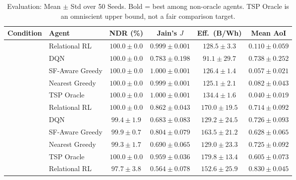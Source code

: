 \documentclass[conference]{IEEEtran}
\begin{document}
\begin{table}[htbp]
\caption{Evaluation: Mean $\pm$ Std over 50 Seeds. Bold = best among non-oracle agents. TSP Oracle is an omniscient upper bound, not a fair comparison target.}
\begin{center}
\setlength{\tabcolsep}{4pt}
\renewcommand{\arraystretch}{1.05}
\begin{tabular}{|c|l|c|c|c|c|}
\hline
\textbf{Condition} & \textbf{Agent} & \textbf{NDR (\%)} & \textbf{Jain's $J$} & \textbf{Eff.\ (B/Wh)} & \textbf{Mean AoI} \\
\hline
{}
  & Relational RL   & $\mathbf{100.0\pm0.0}$ & $\mathbf{0.999\pm0.001}$ & $\mathbf{128.5\pm3.3}$  & $0.110\pm0.059$ \\
  & DQN             & $100.0\pm0.0$           & $0.783\pm0.198$           & $91.1\pm29.7$           & $0.738\pm0.252$ \\
  & SF-Aware Greedy & $100.0\pm0.0$           & $1.000\pm0.001$           & $126.4\pm1.4$           & $\mathbf{0.057\pm0.021}$ \\
  & Nearest Greedy  & $100.0\pm0.0$           & $0.999\pm0.001$           & $125.1\pm2.1$           & $0.082\pm0.043$ \\
  & TSP Oracle      & $100.0\pm0.0$           & $1.000\pm0.001$           & $134.4\pm1.6$           & $0.040\pm0.019$ \\
\hline
{}
  & Relational RL   & $\mathbf{100.0\pm0.0}$ & $\mathbf{0.862\pm0.043}$ & $\mathbf{170.0\pm19.5}$ & $0.714\pm0.092$ \\
  & DQN             & $99.4\pm1.9$            & $0.683\pm0.083$           & $129.2\pm24.5$          & $0.726\pm0.093$ \\
  & SF-Aware Greedy & $99.9\pm0.7$            & $0.804\pm0.079$           & $163.5\pm21.2$          & $0.628\pm0.065$ \\
  & Nearest Greedy  & $99.3\pm1.7$            & $0.690\pm0.065$           & $129.0\pm23.3$          & $0.725\pm0.092$ \\
  & TSP Oracle      & $100.0\pm0.0$           & $0.959\pm0.036$           & $179.8\pm13.4$          & $\mathbf{0.605\pm0.073}$ \\
\hline
{}
  & Relational RL   & $\mathbf{97.7\pm3.8}$  & $\mathbf{0.564\pm0.078}$ & $\mathbf{152.6\pm25.9}$ & $0.830\pm0.045$ \\

\end{tabular}
\end{center}
\end{table}
\end{document}
